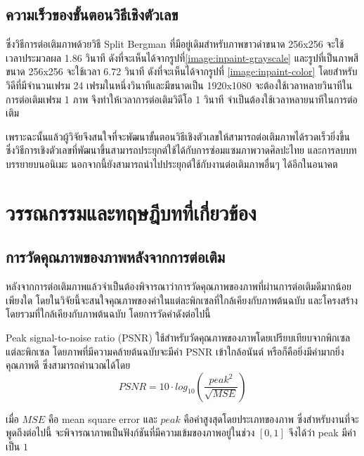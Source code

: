 \documentclass[hidelinks,a4paper,14pt]{article}
\numberwithin{equation}{section}							%
\begin{document}
{		 %
		 \subsection{ความเร็วของขั้นตอนวิธีเชิงตัวเลข}
		 \hspace{1cm}ซึ่งวิธีการต่อเติมภาพด้วยวิธี Split Bergman ที่มีอยู่เดิมสำหรับภาพขาวดำขนาด 256x256 จะใช้เวลาประมวลผล 1.86 วินาที ดังที่จะเห็นได้จากรูปที่\ref{image:inpaint-grayscale} และรูปที่เป็นภาพสีขนาด 256x256 จะใช้เวลา 6.72 วินาที ดังที่จะเห็นได้จากรูปที่ \ref{image:inpaint-color} โดยสำหรับวิดีที่มีจำนวนเฟรม 24 เฟรมในหนึ่งวินาทีและมีขนาดเป็น 1920x1080 จะต้องใช้เวลาหลายวินาทีในการต่อเติมเฟรม 1 ภาพ จึงทำให้เวลาการต่อเติมวิดีโอ 1 วินาที จำเป็นต้องใช้เวลาหลายนาทีในการต่อเติม
		 
		 \hspace{1cm}เพราะฉะนั้นแล้วผู้วิจัยจึงสนใจที่จะพัฒนาขั้นตอนวิธีเชิงตัวเลขให้สามารถต่อเติมภาพได้รวดเร็วยิ่งขึ้น ซึ่งวิธีการเชิงตัวเลขที่พัฒนาขึ้นสามารถประยุกต์ใช้ได้กับการซ่อมแซมภาพวาดศิลปะไทย และการลบบทบรรยายบนอนิเมะ นอกจากนี้ยังสามารถนำไปประยุกต์ใช้กับงานต่อเติมภาพอื่นๆ ได้อีกในอนาคต
		 
\section{วรรณกรรมและทฤษฎีบทที่เกี่ยวข้อง}
 \subsection{การวัดคุณภาพของภาพหลังจากการต่อเติม}
	\hspace{1cm} หลังจากการต่อเติมภาพแล้วจำเป็นต้องพิจารณาว่าการวัดคุณภาพของภาพที่ผ่านการต่อเติมดีมากน้อยเพียงใด โดยในวิจัยนี้จะสนใจคุณภาพของค่าในแต่ละพิกเซลที่ใกล้เคียงกับภาพต้นฉบับ และโครงสร้างโดยรวมที่ใกล้เคียงกับภาพต้นฉบับ โดยการวัดค่าดังต่อไปนี้
	
	\hspace{1cm}  Peak signal-to-noise ratio (PSNR)\cite{ref:PSNR} ใช้สำหรับวัดคุณภาพของภาพโดยเปรียบเทียบจากพิกเซลแต่ละพิกเซล โดยภาพที่มีความคล้ายต้นฉบับจะมีค่า PSNR เข้าใกล้อนันต์ หรือก็คือยิ่งมีค่ามากยิ่งคุณภาพดี ซึ่งสามารถคำนวณได้โดย
	$$ PSNR = 10 \cdot log_{10} ( \frac{{peak}^2}{\sqrt{MSE}} )$$
	
	เมื่อ $MSE$ คือ mean square error และ $peak$ คือค่าสูงสุดโดยประเภทของภาพ ซึ่งสำหรับงานที่จะพูดถึงต่อไปนี้ จะพิจารณาภาพเป็นฟังก์ชันที่มีความเข้มของภาพอยู่ในช่วง $ [0,1] $ จึงได้ว่า peak มีค่าเป็น $1$

}
\end{document}
